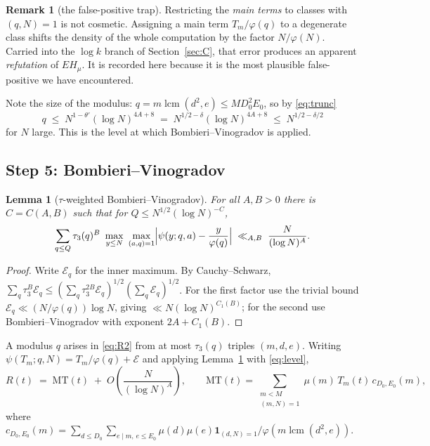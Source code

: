 \documentclass[11pt,a4paper]{article}
\theoremstyle{plain}
\newtheorem{lemma}[theorem]{Lemma}
\theoremstyle{definition}
\newtheorem{remark}[theorem]{Remark}
\DeclareMathOperator{\lcm}{lcm}
\begin{document}
\begin{remark}[the false-positive trap]\label{rem:trap}
Restricting the \emph{main terms} to classes with $(q,N)=1$ is not
cosmetic. Assigning a main term $T_m/\varphi(q)$ to a degenerate class
shifts the density of the whole computation by the factor
$N/\varphi(N)$. Carried into the $\log k$ branch of
Section~\ref{sec:C}, that error produces an apparent \emph{refutation}
of $EH_\mu$. It is recorded here because it is the most plausible
false-positive we have encountered.
\end{remark}

Note the size of the modulus: $q=m\lcm(d^2,e)\le MD_0^2E_0$, so by
\eqref{eq:trunc}
\begin{equation}\label{eq:level}
  q \;\le\; N^{1-\theta'}(\log N)^{4A+8} \;=\; N^{1/2-\delta}(\log N)^{4A+8}
  \;\le\; N^{1/2-\delta/2}
\end{equation}
for $N$ large. This is the level at which Bombieri--Vinogradov is
applied.

\subsection{Step 5: Bombieri--Vinogradov}

\begin{lemma}[$\tau$-weighted Bombieri--Vinogradov]\label{lem:BV}
For all $A,B>0$ there is $C=C(A,B)$ such that for
$Q\le N^{1/2}(\log N)^{-C}$,
\[
  \sum_{q\le Q}\tau_3(q)^{B}\ \max_{y\le N}\ \max_{(a,q)=1}
  \Bigl|\psi(y;q,a)-\frac{y}{\varphi(q)}\Bigr|
  \;\ll_{A,B}\; \frac{N}{(\log N)^{A}} .
\]
\end{lemma}

\begin{proof}
Write $\mathcal E_q$ for the inner maximum. By Cauchy--Schwarz,
$\sum_q\tau_3^B\mathcal E_q\le
(\sum_q\tau_3^{2B}\mathcal E_q)^{1/2}(\sum_q\mathcal E_q)^{1/2}$.
For the first factor use the trivial bound
$\mathcal E_q\ll (N/\varphi(q))\log N$, giving
$\ll N(\log N)^{C_1(B)}$; for the second use Bombieri--Vinogradov with
exponent $2A+C_1(B)$.
\end{proof}

A modulus $q$ arises in \eqref{eq:R2} from at most $\tau_3(q)$ triples
$(m,d,e)$. Writing $\psi(T_m;q,N)=T_m/\varphi(q)+\mathcal E$ and applying
Lemma~\ref{lem:BV} with \eqref{eq:level},
\begin{equation}\label{eq:R3}
  R(t) \;=\; \mathrm{MT}(t) \;+\; O\!\left(\frac{N}{(\log N)^{A}}\right),
  \qquad
  \mathrm{MT}(t)=\sum_{\substack{m<M\\ (m,N)=1}}\mu(m)\,T_m(t)\,c_{D_0,E_0}(m),
\end{equation}
where
$c_{D_0,E_0}(m)=\sum_{d\le D_0}\sum_{e\mid m,\,e\le E_0}
\mu(d)\mu(e)\mathbf 1_{(d,N)=1}/\varphi(m\lcm(d^2,e))$.
\end{document}
